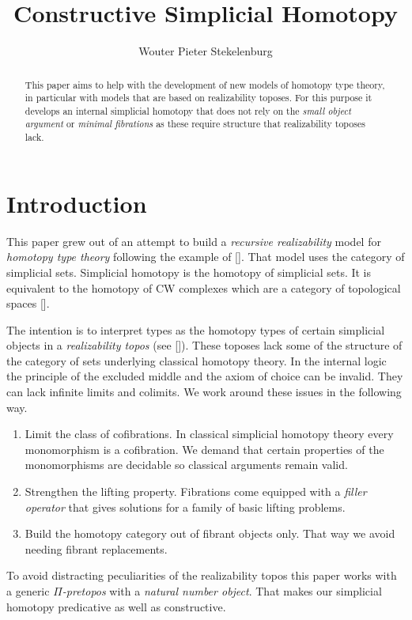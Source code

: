 \documentclass{tac}
\title{Constructive Simplicial Homotopy}
\author{Wouter Pieter Stekelenburg}\copyrightyear{2015}
\newcommand\hide[1]{}
\newcommand\citep[1]{[\cite{#1}]}
\begin{document}
\begin{abstract} This paper aims to help with the development of new models of homotopy type theory, in particular with models that are based on realizability toposes. For this purpose it develops an internal simplicial homotopy that does not rely on the \emph{small object argument} or \emph{minimal fibrations} as these require structure that realizability toposes lack.\end{abstract}

\hide{
Three papers:
-simplicial homotopy
-complete categories [how they are preserved]
-the realizability model of HOTT [how to get a fibrant object out of a category]

Idee: reverse the order. definitions--theorem--lemmas. That way the purpose of the lemmas is set up from the start.
}

\maketitle

\section*{Introduction}
This paper grew out of an attempt to build a \emph{recursive realizability} model for \emph{homotopy type theory} following the example of \citep{KLV12}. That model uses the category of simplicial sets. Simplicial homotopy is the homotopy of simplicial sets. It is equivalent to the homotopy of CW complexes which are a category of topological spaces \citep{Hovey99,GJSHT}.

The intention is to interpret types as the homotopy types of certain simplicial objects in a \emph{realizability topos} (see \citep{MR2479466}). These toposes lack some of the structure of the category of sets underlying classical homotopy theory. In the internal logic the principle of the excluded middle and the axiom of choice can be invalid. They can lack infinite limits and colimits. We work around these issues in the following way.
\begin{enumerate}
\item Limit the class of cofibrations. In classical simplicial homotopy theory every mono\-morphism is a cofibration. We demand that certain properties of the monomorphisms are decidable so classical arguments remain valid.
\item Strengthen the lifting property. Fibrations come equipped with a \emph{filler operator} that gives solutions for a family of basic lifting problems.
\item Build the homotopy category out of fibrant objects only. That way we avoid needing fibrant replacements.
\end{enumerate}
To avoid distracting peculiarities of the realizability topos this paper works with a generic \emph{$\Pi$-pretopos} with a \emph{natural number object}. That makes our simplicial homotopy predicative as well as constructive.
\end{document}
